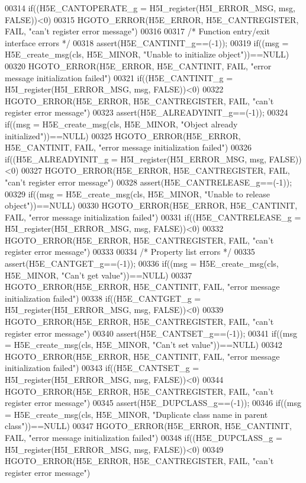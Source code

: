 \begin{DoxyCode}
00314 if((H5E\_CANTOPERATE\_g = H5I\_register(H5I\_ERROR\_MSG, msg, FALSE))<0)
00315     HGOTO\_ERROR(H5E\_ERROR, H5E\_CANTREGISTER, FAIL, "can't register error message")
00316 
00317 \textcolor{comment}{/* Function entry/exit interface errors */}
00318 assert(H5E\_CANTINIT\_g==(-1));
00319 if((msg = H5E\_create\_msg(cls, H5E\_MINOR, "Unable to initialize \textcolor{keywordtype}{object}"))==NULL)
00320     HGOTO\_ERROR(H5E\_ERROR, H5E\_CANTINIT, FAIL, "error message initialization failed")
00321 if((H5E\_CANTINIT\_g = H5I\_register(H5I\_ERROR\_MSG, msg, FALSE))<0)
00322     HGOTO\_ERROR(H5E\_ERROR, H5E\_CANTREGISTER, FAIL, "can't register error message")
00323 assert(H5E\_ALREADYINIT\_g==(-1));
00324 if((msg = H5E\_create\_msg(cls, H5E\_MINOR, "Object already initialized"))==NULL)
00325     HGOTO\_ERROR(H5E\_ERROR, H5E\_CANTINIT, FAIL, "error message initialization failed")
00326 if((H5E\_ALREADYINIT\_g = H5I\_register(H5I\_ERROR\_MSG, msg, FALSE))<0)
00327     HGOTO\_ERROR(H5E\_ERROR, H5E\_CANTREGISTER, FAIL, "can't register error message")
00328 assert(H5E\_CANTRELEASE\_g==(-1));
00329 if((msg = H5E\_create\_msg(cls, H5E\_MINOR, "Unable to release \textcolor{keywordtype}{object}"))==NULL)
00330     HGOTO\_ERROR(H5E\_ERROR, H5E\_CANTINIT, FAIL, "error message initialization failed")
00331 if((H5E\_CANTRELEASE\_g = H5I\_register(H5I\_ERROR\_MSG, msg, FALSE))<0)
00332     HGOTO\_ERROR(H5E\_ERROR, H5E\_CANTREGISTER, FAIL, "can't register error message")
00333 
00334 \textcolor{comment}{/* Property list errors */}
00335 assert(H5E\_CANTGET\_g==(-1));
00336 if((msg = H5E\_create\_msg(cls, H5E\_MINOR, "Can't get value"))==NULL)
00337     HGOTO\_ERROR(H5E\_ERROR, H5E\_CANTINIT, FAIL, "error message initialization failed")
00338 if((H5E\_CANTGET\_g = H5I\_register(H5I\_ERROR\_MSG, msg, FALSE))<0)
00339     HGOTO\_ERROR(H5E\_ERROR, H5E\_CANTREGISTER, FAIL, "can't register error message")
00340 assert(H5E\_CANTSET\_g==(-1));
00341 if((msg = H5E\_create\_msg(cls, H5E\_MINOR, "Can't set value"))==NULL)
00342     HGOTO\_ERROR(H5E\_ERROR, H5E\_CANTINIT, FAIL, "error message initialization failed")
00343 if((H5E\_CANTSET\_g = H5I\_register(H5I\_ERROR\_MSG, msg, FALSE))<0)
00344     HGOTO\_ERROR(H5E\_ERROR, H5E\_CANTREGISTER, FAIL, "can't register error message")
00345 assert(H5E\_DUPCLASS\_g==(-1));
00346 if((msg = H5E\_create\_msg(cls, H5E\_MINOR, "Duplicate class name in parent class"))==NULL)
00347     HGOTO\_ERROR(H5E\_ERROR, H5E\_CANTINIT, FAIL, "error message initialization failed")
00348 if((H5E\_DUPCLASS\_g = H5I\_register(H5I\_ERROR\_MSG, msg, FALSE))<0)
00349     HGOTO\_ERROR(H5E\_ERROR, H5E\_CANTREGISTER, FAIL, "can't register error message")

\end{DoxyCode}
